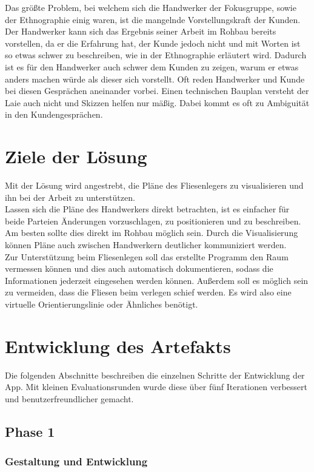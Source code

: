 Das größte Problem, bei welchem sich die Handwerker der Fokusgruppe, sowie der Ethnographie einig waren, ist die mangelnde Vorstellungskraft der Kunden. Der Handwerker kann sich das Ergebnis seiner Arbeit im Rohbau bereits vorstellen, da er die Erfahrung hat, der Kunde jedoch nicht und mit Worten ist so etwas schwer zu beschreiben, wie in der Ethnographie erläutert wird. Dadurch ist es für den Handwerker auch schwer dem Kunden zu zeigen, warum er etwas anders machen würde als dieser sich vorstellt. Oft reden Handwerker und Kunde bei diesen Gesprächen aneinander vorbei. Einen technischen Bauplan versteht der Laie auch nicht und Skizzen helfen nur mäßig. Dabei kommt es oft zu Ambiguität in den Kundengesprächen.

\section{Ziele der Lösung}

Mit der Lösung wird angestrebt, die Pläne des Fliesenlegers zu visualisieren und ihn bei der Arbeit zu unterstützen. \\
Lassen sich die Pläne des Handwerkers direkt betrachten, ist es einfacher für beide Parteien Änderungen vorzuschlagen, zu positionieren und zu beschreiben. Am besten sollte dies direkt im Rohbau möglich sein. Durch die Visualisierung können Pläne auch zwischen Handwerkern deutlicher kommuniziert werden. \\
Zur Unterstützung beim Fliesenlegen soll das erstellte Programm den Raum vermessen können und dies auch automatisch dokumentieren, sodass die Informationen jederzeit eingesehen werden können. Außerdem soll es möglich sein zu vermeiden, dass die Fliesen beim verlegen schief werden. Es wird also eine virtuelle Orientierungslinie oder Ähnliches benötigt.

\section{Entwicklung des Artefakts}

Die folgenden Abschnitte beschreiben die einzelnen Schritte der Entwicklung der App. Mit kleinen Evaluationsrunden wurde diese über fünf Iterationen verbessert und benutzerfreundlicher gemacht.

\subsection{Phase 1}

\subsubsection{Gestaltung und Entwicklung}

